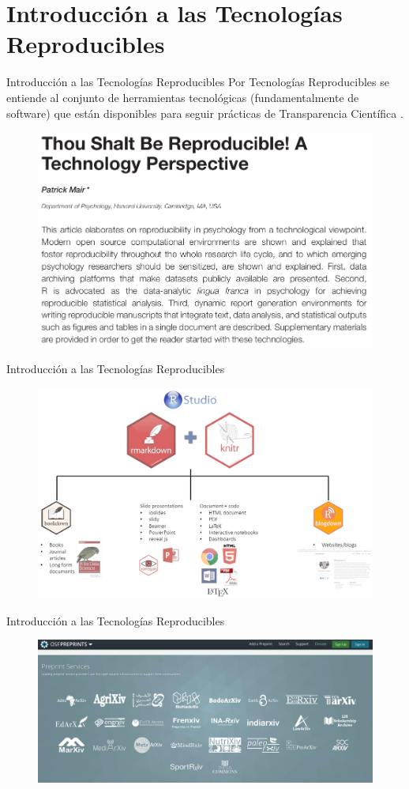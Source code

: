 \documentclass{beamer}
\begin{document}
\section{Introducción a las Tecnologías Reproducibles}
\begin{frame}{Introducción a las Tecnologías Reproducibles}
Por \textcolor{blue!46!green}{Tecnologías Reproducibles} se entiende al conjunto de herramientas tecnológicas (fundamentalmente de software) que están disponibles para seguir prácticas de Transparencia Científica \cite{Mair2016}.
\begin{figure}
\includegraphics[width=.5\textwidth]{TR.png}
\end{figure}
\end{frame}

\begin{frame}{Introducción a las Tecnologías Reproducibles}
\begin{figure}
\includegraphics[width=.8\textwidth]{tools.png}
\end{figure}
\end{frame}

\begin{frame}{Introducción a las Tecnologías Reproducibles}
\begin{figure}
\includegraphics[width=1\textwidth]{Preprints.png}
\end{figure}
\end{frame}
\end{document}
